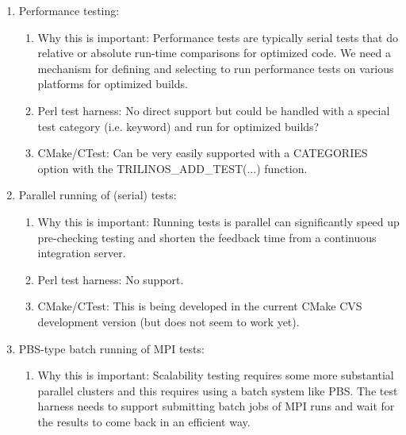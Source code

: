 \documentclass[pdf,ps2pdf,11pt]{SANDreport}
\begin{document}
\begin{enumerate}

{}\item Performance testing:

  \begin{enumerate}

  {}\item Why this is important: Performance tests are typically
  serial tests that do relative or absolute run-time comparisons for
  optimized code.  We need a mechanism for defining and selecting to
  run performance tests on various platforms for optimized builds.

  {}\item Perl test harness: No direct support but could be handled
  with a special test category (i.e. keyword) and run for optimized
  builds?

  {}\item CMake/CTest: Can be very easily supported with a CATEGORIES
  option with the TRILINOS\_ADD\_TEST(...) function.

  \end{enumerate}

{}\item Parallel running of (serial) tests:

  \begin{enumerate}

  {}\item Why this is important: Running tests is parallel can
  significantly speed up pre-checking testing and shorten the feedback
  time from a continuous integration server.

  {}\item Perl test harness: No support.

  {}\item CMake/CTest: This is being developed in the current CMake
  CVS development version (but does not seem to work yet).

  \end{enumerate}

{}\item PBS-type batch running of MPI tests:

  \begin{enumerate}

  {}\item Why this is important: Scalability testing requires some
  more substantial parallel clusters and this requires using a batch
  system like PBS.  The test harness needs to support submitting
  batch jobs of MPI runs and wait for the results to come back in an
  efficient way.


\end{enumerate}
\end{enumerate}
\end{document}
